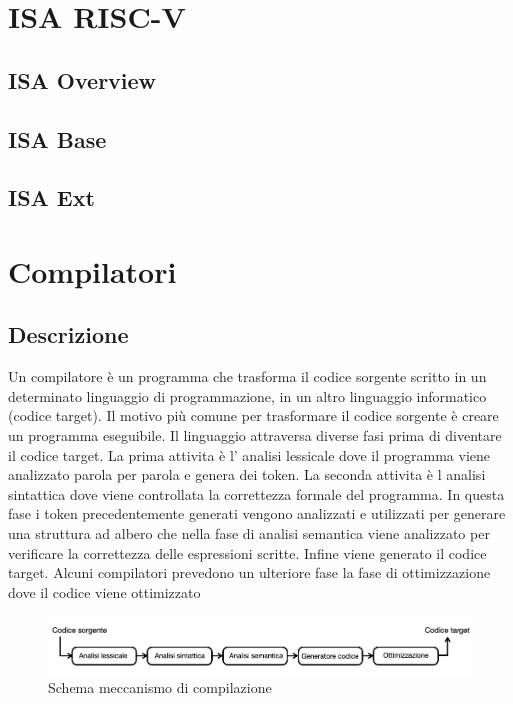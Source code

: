 \documentclass[12pt,a4paper]{report}
\begin{document}
\chapter{ISA RISC-V}
\section{ISA Overview}
\section{ISA Base}
\section{ISA Ext}

\chapter{Compilatori}


\section{Descrizione}
Un compilatore è un programma che trasforma il codice sorgente scritto in un determinato linguaggio di programmazione,  in un altro linguaggio informatico (codice target). Il motivo più comune per trasformare il codice sorgente è creare un programma eseguibile. Il linguaggio attraversa diverse fasi prima di diventare il codice target. La prima attivita è l' analisi lessicale dove il programma viene analizzato parola per parola e genera dei token. La seconda attivita è l analisi sintattica dove viene controllata la correttezza formale del programma. In questa fase i token precedentemente generati vengono analizzati e utilizzati per generare una struttura ad albero che nella fase di analisi semantica viene analizzato per verificare la correttezza delle espressioni scritte.  Infine viene generato il codice target.  Alcuni compilatori prevedono un ulteriore fase la fase di ottimizzazione dove il codice viene ottimizzato 

\begin{figure}
\includegraphics[width = \textwidth]{SchemaCompilatore.png}
\caption{Schema meccanismo di compilazione}
\end{figure}
\end{document}
